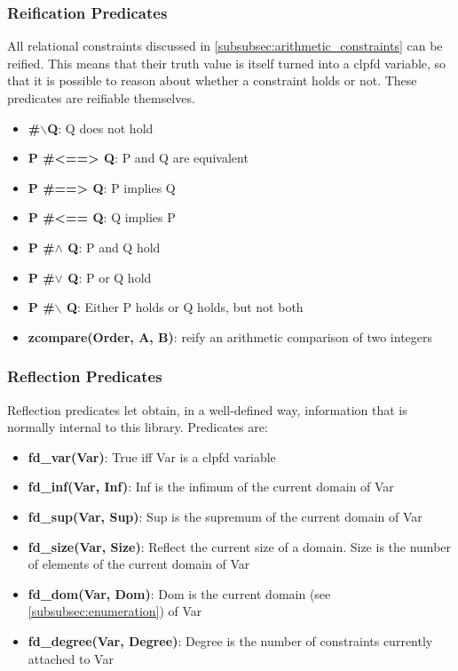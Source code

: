 \subsubsection{Reification Predicates}\label{subsubsec:reification}
All relational constraints discussed in \ref{subsubsec:arithmetic_constraints} can be reified.
This means that their truth value is itself turned into a clpfd variable, so that it is possible to reason about whether a constraint holds or not. These predicates are reifiable themselves.
\begin{itemize}
    \item \textbf{\#$\backslash$Q}: Q does not hold
    \item \textbf{P \#<==> Q}: P and Q are equivalent
    \item \textbf{P \#==> Q}: P implies Q
    \item \textbf{P \#<== Q}: Q implies P
    \item \textbf{P \#$\land$ Q}: P and Q hold
    \item \textbf{P \#$\lor$ Q}: P or Q hold
    \item \textbf{P \#$\backslash$ Q}: Either P holds or Q holds, but not both
    \item \textbf{zcompare(Order, A, B)}: reify an arithmetic comparison of two integers
\end{itemize}

\subsubsection{Reflection Predicates}\label{subsubsec:reflection}
Reflection predicates let obtain, in a well-defined way, information that is normally internal to this library. Predicates are:
\begin{itemize}
    \item \textbf{fd\_var(Var)}: True iff Var is a clpfd variable
    \item \textbf{fd\_inf(Var, Inf)}: Inf is the infimum of the current domain of Var
    \item \textbf{fd\_sup(Var, Sup)}: Sup is the supremum of the current domain of Var
    \item \textbf{fd\_size(Var, Size)}: Reflect the current size of a domain. Size is the number of elements of the current domain of Var
    \item \textbf{fd\_dom(Var, Dom)}: Dom is the current domain (see \ref{subsubsec:enumeration}) of Var
    \item \textbf{fd\_degree(Var, Degree)}: Degree is the number of constraints currently attached to Var
\end{itemize}

